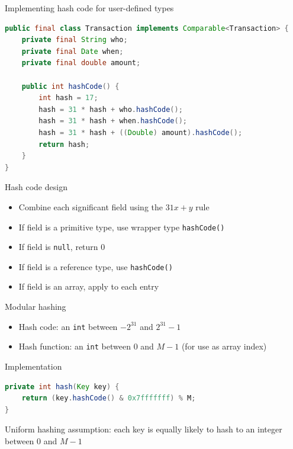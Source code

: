 \documentclass[8pt,a4paper,compress]{beamer}
\begin{document}
\begin{frame}[fragile]
\pause

Implementing hash code for user-defined types
\begin{lstlisting}[language=Java]
public final class Transaction implements Comparable<Transaction> {
    private final String who;
    private final Date when;
    private final double amount;

    public int hashCode() {
        int hash = 17;
        hash = 31 * hash + who.hashCode();
        hash = 31 * hash + when.hashCode();
        hash = 31 * hash + ((Double) amount).hashCode();
        return hash;
    }
}
\end{lstlisting}

\pause
\bigskip

Hash code design
\begin{itemize}
\item Combine each significant field using the $31x + y$ rule

\item If field is a primitive type, use wrapper type \lstinline{hashCode()}

\item If field is \lstinline{null}, return 0

\item If field is a reference type, use \lstinline{hashCode()}

\item If field is an array, apply to each entry
\end{itemize}
\end{frame}

\begin{frame}[fragile]
\pause

Modular hashing
\begin{itemize}
\item Hash code: an \lstinline{int} between $-2^{31}$ and $2^{31} - 1$

\item Hash function: an \lstinline{int} between 0 and $M-1$ (for use as array index)
\end{itemize}

\pause
\bigskip

Implementation

\begin{lstlisting}[language=Java]
private int hash(Key key) { 
    return (key.hashCode() & 0x7fffffff) % M;
}
\end{lstlisting}

\pause
\bigskip

Uniform hashing assumption: each key is equally likely to hash to an integer between 0 and $M-1$
\end{frame}
\end{document}
